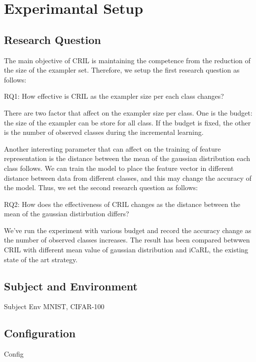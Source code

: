 \section{Experimantal Setup}
\label{sec:setup}

\subsection{Research Question}
\label{sec:rq}

The main objective of CRIL is maintaining the competence from the reduction of the size of the exampler set. Therefore, we setup the first research question as follows:

\begin{framed}
\textsc{RQ1}: How effective is CRIL as the exampler size per each class changes?
\label{rq1}
\end{framed}

There are two factor that affect on the exampler size per class. One is the budget: the size of the exampler can be store for all class. If the budget is fixed, the other is the number of observed classes during the incremental learning.

Another interesting parameter that can affect on the training of feature representation is the distance between the mean of the gaussian distribution each class follows. We can train the model to place the feature vector in different distance between data from different classes, and this may change the accuracy of the model. Thus, we set the second research question as follows:

\begin{framed}
\textsc{RQ2}: How does the effectiveness of CRIL changes as the distance between the mean of the gaussian distirbution differs?
\label{rq2}
\end{framed}

We've run the experiment with various budget and record the accuracy change as the number of observed classes increases. The result has been compared betwwen CRIL with different mean value of gaussian distribution and iCaRL, the existing state of the art strategy.

\subsection{Subject and Environment}
\label{sec:subject}

Subject
Env
MNIST, CIFAR-100

\subsection{Configuration}
\label{sec:configuration}


Config
